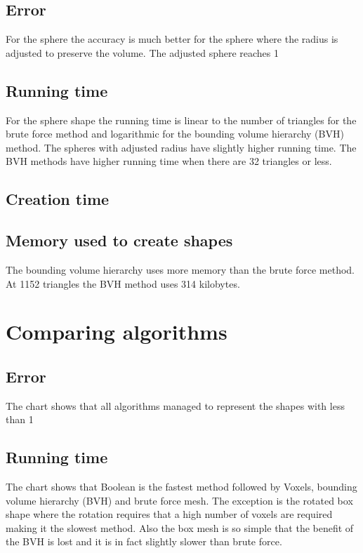 \documentclass[11pt,twoside,a4paper]{report}
\begin{document}
\subsection{Error}

For the sphere the accuracy is much better for the sphere where the radius is adjusted to preserve the volume. The adjusted sphere reaches 1%
\subsection{Running time}

For the sphere shape the running time is linear to the number of triangles for the brute force method and logarithmic for the bounding volume hierarchy (BVH) method. The spheres with adjusted radius have slightly higher running time. The BVH methods have higher running time when there are 32 triangles or less.

\subsection{Creation time}

\subsection{Memory used to create shapes}
The bounding volume hierarchy uses more memory than the brute force method.  At 1152 triangles the BVH method uses 314 kilobytes.

\section{Comparing algorithms}

\subsection{Error}
The chart shows that all algorithms managed to represent the shapes with less than 1 %

\subsection{Running time}
The chart shows that Boolean is the fastest method followed by Voxels, bounding volume hierarchy (BVH) and brute force mesh. The exception is the rotated box shape where the rotation requires that a high number of voxels are required making it the slowest method. Also the box mesh is so simple that the benefit of the BVH is lost and it is in fact slightly slower than brute force.
\end{document}
